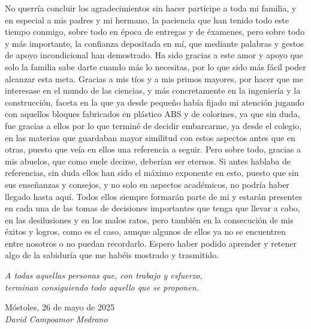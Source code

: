 No querría concluir los agradecimientos sin hacer partícipe a toda mi familia, y en especial a mis padres y mi hermano, la paciencia que han tenido todo este tiempo conmigo, sobre todo en época de entregas y de éxamenes, pero sobre todo y más importante, la confianza depositada en mí, que mediante palabras y gestos de apoyo incondicional han demostrado. Ha sido gracias a este amor y apoyo que solo la familia sabe darte cuando más lo necesitas, por lo que sido más fácil poder alcanzar esta meta. Gracias a mis tíos y a mis primos mayores, por hacer que me interesase en el mundo de las ciencias, y más concretamente en la ingeniería y la construcción, faceta en la que ya desde pequeño había fijado mi atención jugando con aquellos bloques fabricados en plástico ABS y de colorines, ya que sin duda, fue gracias a ellos por lo que terminé de decidir embarcarme, ya desde el colegio, en las materias que guardaban mayor similitud con estos aspectos antes que en otras, puesto que veía en ellos una referencia a seguir. Pero sobre todo, gracias a mis abuelos, que como suele decirse, deberían ser eternos. Si antes hablaba de referencias, sin duda ellos han sido el máximo exponente en esto, puesto que sin sus enseñanzas y consejos, y no solo en aspectos académicos, no podría haber llegado hasta aquí. Todos ellos siempre formarán parte de mi y estarán presentes en cada una de las tomas de decisiones importantes que tenga que llevar a cabo, en las desilusiones y en los malos ratos, pero también en la consecución de mis éxitos y logros, como es el caso, aunque algunos de ellos ya no se encuentren entre nosotros o no puedan recordarlo. Espero haber podido aprender y retener algo de la sabiduría que me habéis mostrado y trasmitido.\\

\begin{flushright}
		\emph{A todas aquellas personas que, con trabajo y esfuerzo,\\
 terminan consiguiendo todo aquello que se proponen.}\\
		\par
		\vspace{1.0 cm}
		Móstoles, 26 de mayo de 2025\\ %
		\emph{David Campoamor Medrano}
\end{flushright}

\thispagestyle{empty}

